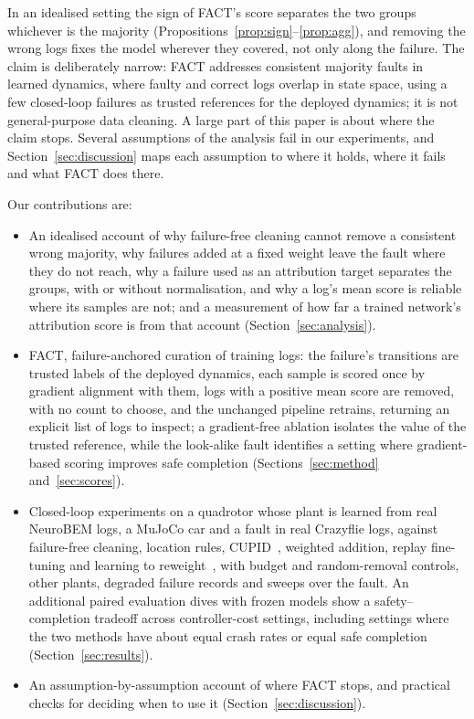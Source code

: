 \documentclass[preprint,12pt]{elsarticle}
\newcommand{\method}{FACT}
\begin{document}
In an idealised setting the sign of \method{}'s score separates the two groups whichever is the majority (Propositions~\ref{prop:sign}--\ref{prop:agg}), and removing the wrong logs fixes the model wherever they covered, not only along the failure. The claim is deliberately narrow: \method{} addresses consistent majority faults in learned dynamics, where faulty and correct logs overlap in state space, using a few closed-loop failures as trusted references for the deployed dynamics; it is not general-purpose data cleaning. A large part of this paper is about where the claim stops. Several assumptions of the analysis fail in our experiments, and Section~\ref{sec:discussion} maps each assumption to where it holds, where it fails and what \method{} does there.

\noindent Our contributions are:
\begin{itemize}
\item An idealised account of why failure-free cleaning cannot remove a consistent wrong majority, why failures added at a fixed weight leave the fault where they do not reach, why a failure used as an attribution target separates the groups, with or without normalisation, and why a log's mean score is reliable where its samples are not; and a measurement of how far a trained network's attribution score is from that account (Section~\ref{sec:analysis}).
\item \method{}, failure-anchored curation of training logs: the failure's transitions are trusted labels of the deployed dynamics, each sample is scored once by gradient alignment with them, logs with a positive mean score are removed, with no count to choose, and the unchanged pipeline retrains, returning an explicit list of logs to inspect; a gradient-free ablation isolates the value of the trusted reference, while the look-alike fault identifies a setting where gradient-based scoring improves safe completion (Sections~\ref{sec:method} and~\ref{sec:scores}).
\item Closed-loop experiments on a quadrotor whose plant is learned from real NeuroBEM logs, a MuJoCo car and a fault in real Crazyflie logs, against failure-free cleaning, location rules, CUPID~\citep{agia2025cupid}, weighted addition, replay fine-tuning and learning to reweight~\citep{ren2018l2rw}, with budget and random-removal controls, other plants, degraded failure records and sweeps over the fault. An additional \CostDives{} paired evaluation dives with frozen models show a safety--completion tradeoff across controller-cost settings, including settings where the two methods have about equal crash rates or equal safe completion (Section~\ref{sec:results}).
\item An assumption-by-assumption account of where \method{} stops, and practical checks for deciding when to use it (Section~\ref{sec:discussion}).
\end{itemize}
\end{document}
